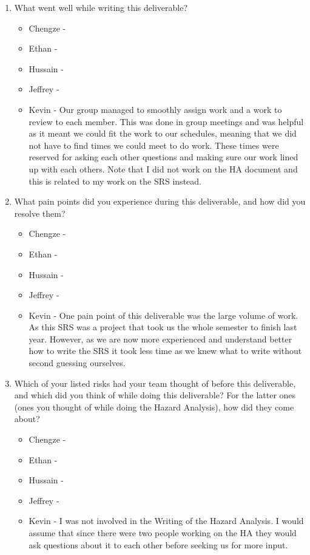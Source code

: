 \documentclass{article}
\begin{document}
\begin{enumerate}
    \item What went well while writing this deliverable? 
    \begin{itemize}
        \item Chengze - 
        \item Ethan - 
        \item Hussain - 
        \item Jeffrey - 
        \item Kevin - Our group managed to smoothly assign work and a work to review to each member. This was done in group meetings and was helpful as it meant we could fit the work to our schedules, meaning that we did not have to find times we could meet to do work. These times were reserved for asking each other questions and making sure our work lined up with each others. Note that I did not work on the HA document and this is related to my work on the SRS instead.  
    \end{itemize} 
    \item What pain points did you experience during this deliverable, and how
    did you resolve them?
    \begin{itemize}
        \item Chengze - 
        \item Ethan - 
        \item Hussain - 
        \item Jeffrey - 
        \item Kevin - One pain point of this deliverable was the large volume of work. As this SRS was a project that took us the whole semester to finish last year. However, as we are now more experienced and understand better how to write the SRS it took less time as we knew what to write without second guessing ourselves.
    \end{itemize} 
    \item Which of your listed risks had your team thought of before this
    deliverable, and which did you think of while doing this deliverable? For
    the latter ones (ones you thought of while doing the Hazard Analysis), how
    did they come about?
    \begin{itemize}
        \item Chengze - 
        \item Ethan - 
        \item Hussain - 
        \item Jeffrey - 
        \item Kevin - I was not involved in the Writing of the Hazard Analysis. I would assume that since there were two people working on the HA they would ask questions about it to each other before seeking us for more input. 

\end{itemize}
\end{enumerate}
\end{document}
